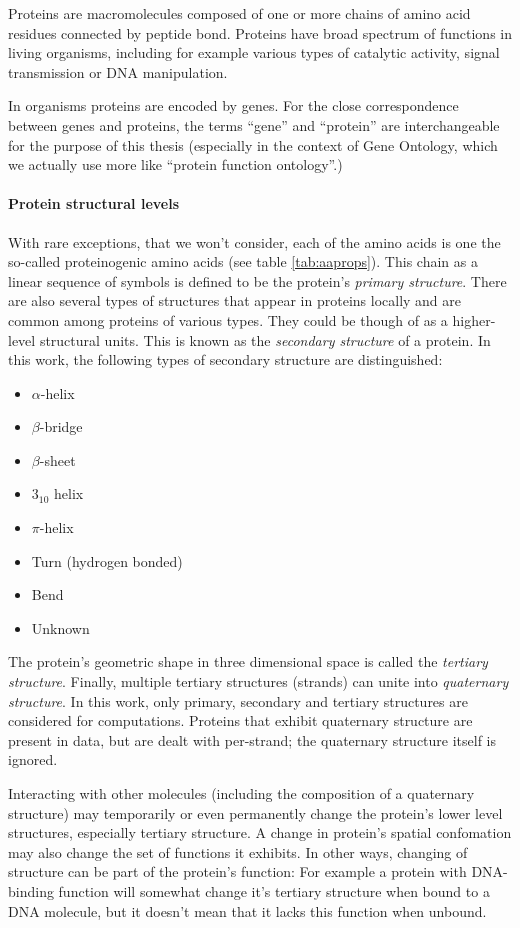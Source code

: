 \documentclass[11pt,twoside,a4paper]{book}
\begin{document}
Proteins are macromolecules composed of one or more chains of amino acid residues
connected by peptide bond.
Proteins have broad spectrum of functions in living organisms, including for example 
various types of catalytic activity, signal transmission or DNA manipulation.

In organisms proteins are encoded by genes. 
For the close correspondence between genes and proteins,
the terms ``gene'' and ``protein'' are interchangeable for the purpose of this thesis
(especially in the context of Gene Ontology, which we actually use more like ``protein function ontology''.)

\paragraph{Protein structural levels} With rare exceptions, that we won't consider, each of the amino acids is one the
so-called proteinogenic amino acids (see table \ref{tab:aaprops}). 
This chain as a linear sequence of symbols is defined to be the protein's \emph{primary structure}.
There are also several types of structures that appear in proteins locally and are common among
proteins of various types.
They could be though of as a higher-level structural units. This is known as the \emph{secondary structure}
of a protein. In this work, the following types of secondary structure are distinguished:
\begin{itemize}
 \item $\alpha$-helix
 \item $\beta$-bridge
 \item $\beta$-sheet
 \item $3_{10}$ helix
 \item $\pi$-helix
 \item Turn (hydrogen bonded)
 \item Bend
 \item Unknown
\end{itemize}
The protein's geometric shape in three dimensional space is called the \emph{tertiary structure}. 
Finally, multiple tertiary structures (strands) can unite into \emph{quaternary structure}.
In this work, only primary, secondary and tertiary structures are considered for computations.
Proteins that exhibit quaternary structure are present in data, but are dealt with per-strand; 
the quaternary structure itself is ignored.

Interacting with other molecules (including the composition of a quaternary structure)
may temporarily or even permanently change the protein's lower level structures,
especially tertiary structure.
A change in protein's spatial confomation may also change the set of functions
it exhibits. 
In other ways, changing of structure can be part of the protein's function:
For example a protein with DNA-binding function will somewhat change it's tertiary
structure when bound to a DNA molecule, but it doesn't mean that it lacks this
function when unbound.
\end{document}
